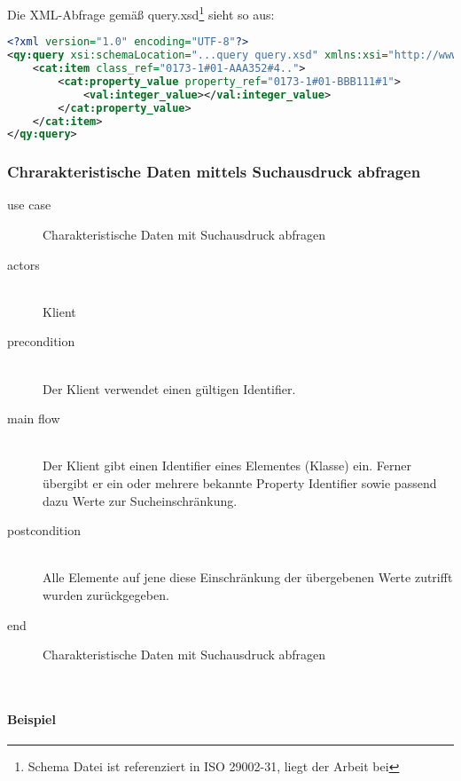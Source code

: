 Die XML-Abfrage gemäß query.xsd\footnote{Schema Datei ist referenziert in ISO 29002-31, liegt der Arbeit bei} sieht so aus:

\begin{lstlisting}[caption=Query Beispiel - Daten abfragen, language=XML, label=UseCaseDatenabfragen]
<?xml version="1.0" encoding="UTF-8"?>
<qy:query xsi:schemaLocation="...query query.xsd" xmlns:xsi="http://www.w3.org/2001/XMLSchema-instance" xmlns:cat="...catalogue" xmlns:val="...value" xmlns:qy="...query" xmlns:bas="...basic">
	<cat:item class_ref="0173-1#01-AAA352#4..">
		<cat:property_value property_ref="0173-1#01-BBB111#1">
			<val:integer_value></val:integer_value>
		</cat:property_value>
	</cat:item>
</qy:query>
\end{lstlisting}

\subsubsection{Chrarakteristische Daten mittels Suchausdruck abfragen }

{\small

\begin{description}
     \item[use case] Charakteristische Daten mit Suchausdruck abfragen
     \item[  actors]~\\
     Klient
     \item[  precondition]~\\
     Der Klient verwendet einen gültigen Identifier.
     \item[  main flow]~\\
     Der Klient gibt einen Identifier eines Elementes (Klasse) ein. Ferner übergibt er ein oder mehrere bekannte Property Identifier sowie passend dazu Werte zur Sucheinschränkung. 
     \item[  postcondition]~\\
     Alle Elemente auf jene diese Einschränkung der übergebenen Werte zutrifft wurden zurückgegeben. 
     \item[end] Charakteristische Daten mit Suchausdruck abfragen
\end{description}

~\\

} %

\paragraph{Beispiel}

